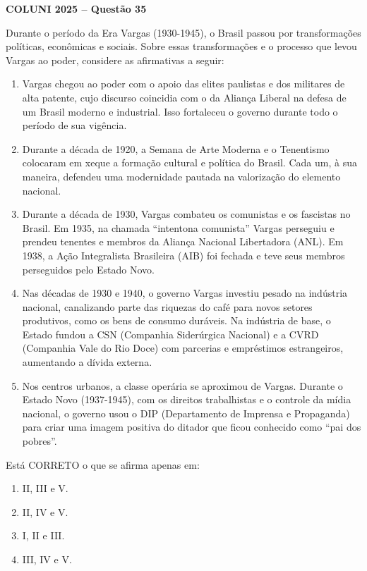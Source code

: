 \textbf{COLUNI 2025 -- Questão 35}\par\medskip Durante o período da Era Vargas (1930-1945), o Brasil passou por transformações políticas, econômicas e sociais. Sobre essas transformações e o processo que levou Vargas ao poder, considere as afirmativas a seguir:
\begin{enumerate}
\item[I.] Vargas chegou ao poder com o apoio das elites paulistas e dos militares de alta patente, cujo discurso coincidia com o da Aliança Liberal na defesa de um Brasil moderno e industrial. Isso fortaleceu o governo durante todo o período de sua vigência.
\item[II.] Durante a década de 1920, a Semana de Arte Moderna e o Tenentismo colocaram em xeque a formação cultural e política do Brasil. Cada um, à sua maneira, defendeu uma modernidade pautada na valorização do elemento nacional.
\item[III.] Durante a década de 1930, Vargas combateu os comunistas e os fascistas no Brasil. Em 1935, na chamada “intentona comunista” Vargas perseguiu e prendeu tenentes e membros da Aliança Nacional Libertadora (ANL). Em 1938, a Ação Integralista Brasileira (AIB) foi fechada e teve seus membros perseguidos pelo Estado Novo.
\item[IV.] Nas décadas de 1930 e 1940, o governo Vargas investiu pesado na indústria nacional, canalizando parte das riquezas do café para novos setores produtivos, como os bens de consumo duráveis. Na indústria de base, o Estado fundou a CSN (Companhia Siderúrgica Nacional) e a CVRD (Companhia Vale do Rio Doce) com parcerias e empréstimos estrangeiros, aumentando a dívida externa.
\item[V.] Nos centros urbanos, a classe operária se aproximou de Vargas. Durante o Estado Novo (1937-1945), com os direitos trabalhistas e o controle da mídia nacional, o governo usou o DIP (Departamento de Imprensa e Propaganda) para criar uma imagem positiva do ditador que ficou conhecido como “pai dos pobres”.
\end{enumerate}
Está CORRETO o que se afirma apenas em:
\begin{enumerate}
\item II, III e V.
\item II, IV e V.
\item I, II e III.
\item III, IV e V.
\end{enumerate}
